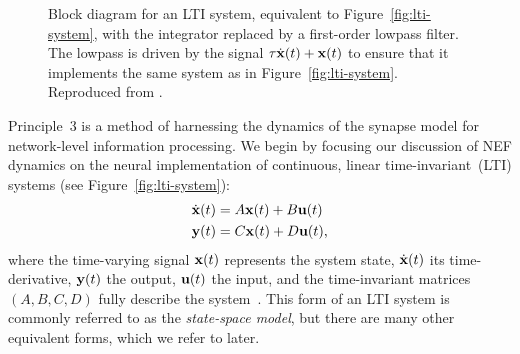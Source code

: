 \begin{figure}
{  
  }
  \caption[Principle~3 for a linear time-invariant system.]{ \label{fig:lti-system-mapped}
    Block diagram for an LTI system, equivalent to Figure~\ref{fig:lti-system}, with the integrator replaced by a first-order lowpass filter.
    The lowpass is driven by the signal $\tau \dot{\mathbf{x}}(t) + \mathbf{x}(t)$ to ensure that it implements the same system as in Figure~\ref{fig:lti-system}.
    Reproduced from \citet[][Figure~2]{voelker2018}.
  }
\end{figure}

Principle~3 is a method of harnessing the dynamics of the synapse model for network-level information processing.
We begin by focusing our discussion of NEF dynamics on the neural implementation of continuous, linear time-invariant~(LTI) systems (see Figure~\ref{fig:lti-system}):
\begin{equation} \label{eq:lti}
\begin{split}
\dot{\mathbf{x}}(t) &= A\mathbf{x}(t) + B\mathbf{u}(t) \\
\mathbf{y}(t) &= C\mathbf{x}(t) + D\mathbf{u}(t) \text{,}
\end{split}
\end{equation}
where the time-varying signal $\mathbf{x}(t)$ represents the system state, $\dot{\mathbf{x}}(t)$ its time-derivative, $\mathbf{y}(t)$ the output, $\mathbf{u}(t)$ the input, and the time-invariant matrices $(A\text{,}\, B\text{,}\, C\text{,}\, D)$ fully describe the system~\citep{brogan1982modern}.
This form of an LTI system is commonly referred to as the \emph{state-space model}, but there are many other equivalent forms, which we refer to later.


